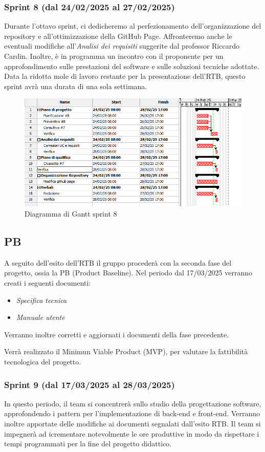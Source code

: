 \subsubsection{Sprint 8 (dal 24/02/2025 al 27/02/2025)}
Durante l'ottavo sprint, ci dedicheremo al perfezionamento dell'organizzazione del repository e all'ottimizzazione della GitHub Page.
Affronteremo anche le eventuali modifiche all'\textit{Analisi dei requisiti} suggerite dal professor Riccardo Cardin.
Inoltre, è in programma un incontro con il proponente per un approfondimento sulle prestazioni del software e sulle soluzioni tecniche adottate.
Data la ridotta mole di lavoro restante per la presentazione dell'RTB, questo sprint avrà una durata di una sola settimana.

\begin{figure}[h!]
    \centering
    \includegraphics[scale = 0.7]{template/images/gantt8.png}
    \caption{Diagramma di Gantt sprint 8}
    \label{fig:3.8} %
\end{figure}

\subsection{PB}
A seguito dell'esito dell'RTB il gruppo procederà con la seconda fase del progetto, ossia la PB (Product Baseline).
Nel periodo dal 17/03/2025 verranno creati i seguenti documenti:
\begin{itemize}
    \item \textit{Specifica tecnica}
    \item \textit{Manuale utente}
\end{itemize}
Verranno inoltre corretti e aggiornati i documenti della fase precedente.

Verrà realizzato il Minimun Viable Product (MVP), per valutare la fattibilità tecnologica del progetto.

\subsubsection{Sprint 9 (dal 17/03/2025 al 28/03/2025)}
In questo periodo, il team si concentrerà sullo studio della progettazione software, approfondendo i pattern per l’implementazione di back-end e front-end.
Verranno inoltre apportate delle modifiche ai documenti segnalati dall'esito RTB.
Il team si impegnerà ad icrementare notevolmente le ore produttive in modo da rispettare i tempi programmati per la fine del progetto didattico.



